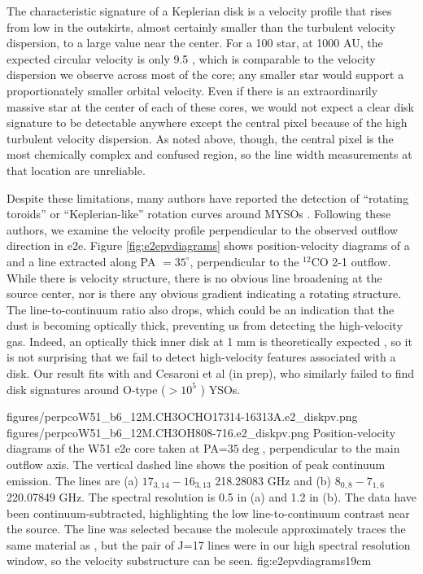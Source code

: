 \documentclass[twocolumn]{aastex61}
\begin{document}
The characteristic signature of a Keplerian disk is a velocity profile that
rises from low in the outskirts, almost certainly smaller than the turbulent
velocity dispersion, to a large value near the center.  For a 100 \msun star,
at 1000 AU, the expected circular velocity is only 9.5 \kms, which is comparable
to the velocity dispersion we observe across most of the core; any smaller
star would support a proportionately smaller orbital velocity.  Even if there
is an extraordinarily massive star at the center of each of these cores, we
would not expect a clear disk signature to be detectable anywhere except the
central pixel because of the high turbulent velocity dispersion.  As noted
above, though, the central pixel is the most chemically complex and confused
region, so the line width measurements at that location are unreliable.

Despite these limitations, many authors have reported the detection of
``rotating toroids'' or ``Keplerian-like'' rotation curves around MYSOs
\citep{Johnston2015a,Chen2016b,Ilee2016a,Zapata2015a,Hunter2014a,Sanchez-Monge2013a,Moscadelli2014a}.
Following these authors, we examine the velocity profile perpendicular to the
observed outflow direction in e2e.  Figure \ref{fig:e2epvdiagrams} shows
position-velocity diagrams of a \methanol and a \methylformate line extracted
along PA $=35^\circ$, perpendicular to the $^{12}$CO 2-1 outflow.
While there
is velocity structure, there is no obvious line broadening at the source
center, nor is there any obvious gradient indicating a rotating structure.  The
line-to-continuum ratio also drops, which could be an indication that the dust
is becoming optically thick, preventing us from detecting the
high-velocity gas.  Indeed, an optically thick inner disk at 1 mm is theoretically
expected \citep{Forgan2016a,Klassen2016a}, so it is not surprising that we fail
to detect high-velocity features associated with a disk.  Our result fits with
\citet{Maud2017a} and Cesaroni et al (in prep), who similarly failed to find
disk signatures around O-type ($>10^5$ \lsun) YSOs.

\FigureTwo
{figures/perpcoW51_b6_12M.CH3OCHO17314-16313A.e2_diskpv.png}
{figures/perpcoW51_b6_12M.CH3OH808-716.e2_diskpv.png}
{Position-velocity diagrams of the W51 e2e core taken at PA=$35\deg$,
perpendicular to the main outflow axis.  The vertical dashed line shows the
position of peak continuum emission. The lines are (a) \methylformate
$17_{3,14}-16_{3,13}$ 218.28083 GHz and (b) \methanol $8_{0,8}-7_{1,6}$
220.07849 GHz.  The spectral resolution is 0.5 \kms in (a) and 1.2 \kms in (b).
The data have been continuum-subtracted, highlighting the low line-to-continuum
contrast near the source.  The \methylformate line was selected because the
molecule approximately traces the same material as \methanol, but the pair of
\methylformate J=17 lines were in our high spectral resolution window, so the
velocity substructure can be seen.
}
{fig:e2epvdiagrams}{1}{9cm}
\end{document}
